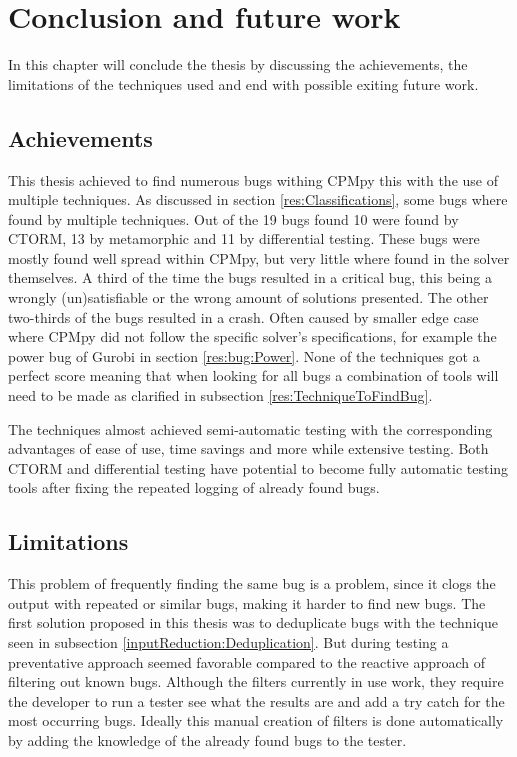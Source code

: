 \chapter{Conclusion and future work}
\label{cha:conclusion}
\label{con:intro}
In this chapter will conclude the thesis by discussing the achievements, the limitations of the techniques used and end with possible exiting future work.

\section{Achievements}
\label{con:Achievements}
This thesis achieved to find numerous bugs withing CPMpy this with the use of multiple techniques. As discussed in section \ref{res:Classifications}, some bugs where found by multiple techniques. Out of the 19 bugs found 10 were found by CTORM, 13 by metamorphic and 11 by differential testing. These bugs were mostly found well spread within CPMpy, but very little where found in the solver themselves. A third of the time the bugs resulted in a critical bug, this being a wrongly (un)satisfiable or the wrong amount of solutions presented. The other two-thirds of the bugs resulted in a crash. Often caused by smaller edge case where CPMpy did not follow the specific solver's specifications, for example the power bug of Gurobi in section \ref{res:bug:Power}. None of the techniques got a perfect score meaning that when looking for all bugs a combination of tools will need to be made as clarified in subsection \ref{res:TechniqueToFindBug}.

The techniques almost achieved semi-automatic testing with the corresponding advantages of ease of use, time savings and more while extensive testing. Both CTORM and differential testing have potential to become fully automatic testing tools after fixing the repeated logging of already found bugs.


\section{Limitations}
\label{con:Limitations}
This problem of frequently finding the same bug is a problem, since it clogs the output with repeated or similar bugs, making it harder to find new bugs. The first solution proposed in this thesis was to deduplicate bugs with the technique seen in subsection \ref{inputReduction:Deduplication}. But during testing a preventative approach seemed  favorable compared to the reactive approach of filtering out known bugs. Although the filters currently in use work, they require the developer to run a tester see what the results are and add a try catch for the most occurring bugs. Ideally this manual creation of filters is done automatically by adding the knowledge of the already found bugs to the tester. 

